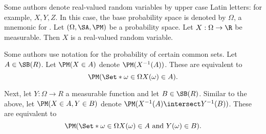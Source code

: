 Some authors denote real-valued random variables by upper case Latin letters:
for example, $X, Y, Z$.  In this case, the base probability space is denoted by $\Omega$, a mnemonic for .
Let $(\Omega,\SA,\PM)$ be a probability space.
Let $X: \Omega \to \R$ be measurable.
Then $X$ is a real-valued random variable.

Some authors use notation for the probability of certain common sets.
Let $A \in \SB(R)$.
Let $\PM(X \in A)$ denote $\PM(X^{-1}(A))$.
These are equivalent to
\[
  \PM(\Set*{\omega \in \Omega}{X(\omega) \in A}).
\]

Next, let $Y: \Omega \to R$
a measurable function and
let $B \in \SB(R)$.
Similar to the above,
let $\PM(X \in A,Y \in B)$
denote $\PM(X^{-1}(A) \intersect Y^{-1}(B))$.
These are equivalent to
\[
  \PM(\Set*{\omega \in \Omega}{X(\omega) \in A \text{ and } Y(\omega) \in B}).
\]
\strats
